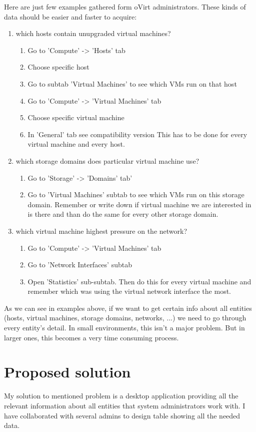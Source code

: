Here are just few examples gathered form oVirt administrators. These kinds of data should be easier and faster to acquire:
\begin{enumerate}
\item which hosts contain unupgraded virtual machines?
\begin{enumerate}
\item Go to 'Compute' -> 'Hosts' tab
\item Choose specific host
\item Go to subtab 'Virtual Machines' to see which VMs run on that host
\item Go to 'Compute' -> 'Virtual Machines' tab
\item Choose specific virtual machine
\item In 'General' tab see compatibility version
This has to be done for every virtual machine and every host.
\end{enumerate}
\item which storage domains does particular virtual machine use?
\begin{enumerate}
\item Go to 'Storage' -> 'Domains' tab'
\item Go to 'Virtual Machines' subtab to see which VMs run on this storage domain. Remember or write down if virtual machine we are interested in is there and than do the same for every other storage domain.
\end{enumerate}
\item which virtual machine highest pressure on the network?
\begin{enumerate}
\item Go to 'Compute' -> 'Virtual Machines' tab
\item Go to 'Network Interfaces' subtab
\item Open 'Statistics' sub-subtab. Then do this for every virtual machine and remember which was using the virtual network interface the most.
\end{enumerate}
\end{enumerate}

As we can see in examples above, if we want to get certain info about all entities (hosts, virtual machines, storage domains, networks, ...) we need to go through every entity's detail. In small environments, this isn't a major problem. But in larger ones, this becomes a very time consuming process.

\section{Proposed solution}
My solution to mentioned problem is a desktop application providing all the relevant information about all entities that system administrators work with. I have collaborated with several admins to design table showing all the needed data.

